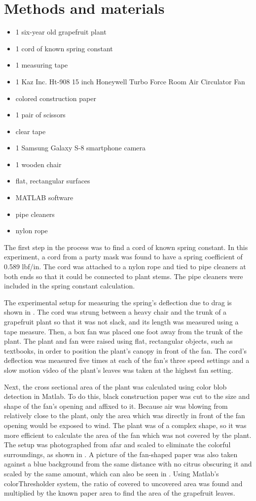 \documentclass{article}
\begin{document}
\section{Methods and materials}
\begin{itemize}
\item 1 six-year old grapefruit plant
\item 1 cord of known spring constant
\item 1 measuring tape
\item 1 Kaz Inc. Ht-908 15 inch Honeywell Turbo Force Room Air Circulator Fan
\item colored construction paper
\item 1 pair of scissors
\item clear tape
\item 1 Samsung Galaxy S-8 smartphone camera
\item 1 wooden chair
\item flat, rectangular surfaces
\item MATLAB software
\item pipe cleaners
\item nylon rope
\end{itemize}

The first step in the process was to find a cord of known spring constant. In this experiment, a cord from a party mask was found to have a spring coefficient of 0.589 lbf/in. The cord was attached to a nylon rope and tied to pipe cleaners at both ends so that it could be connected to plant stems. The pipe cleaners were included in the spring constant calculation.

The experimental setup for measuring the spring's deflection due to drag is shown in . The cord was strung between a heavy chair and the trunk of a grapefruit plant so that it was not slack, and its length was measured using a tape measure. Then, a box fan was placed one foot away from the trunk of the plant. The plant and fan were raised using flat, rectangular objects, such as textbooks, in order to position the plant's canopy in front of the fan. The cord's deflection was measured five times at each of the fan's three speed settings and a slow motion video of the plant's leaves was taken at the highest fan setting.

Next, the cross sectional area of the plant was calculated using color blob detection in Matlab. To do this, black construction paper was cut to the size and shape of the fan's opening and affixed to it. Because air was blowing from relatively close to the plant, only the area which was directly in front of the fan opening would be exposed to wind. The plant was of a complex shape, so it was more efficient to calculate the area of the fan which was not covered by the plant. The setup was photographed from afar and scaled to eliminate the colorful surroundings, as shown in . A picture of the fan-shaped paper was also taken against a blue background from the same distance with no citrus obscuring it and scaled by the same amount, which can also be seen in . Using Matlab's colorThresholder system, the ratio of covered to uncovered area was found and multiplied by the known paper area to find the area of the grapefruit leaves.
\end{document}
